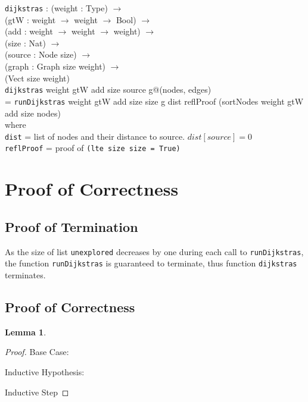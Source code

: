 \documentclass[11pt, oneside]{article}   	%
\newcommand\tab[1][1cm]{\hspace*{#1}}
\newtheorem*{lemma}{Lemma}
\begin{document}
\texttt{dijkstras} :  (weight : Type) $\rightarrow$ \\
                \tab\tab (gtW : weight $\rightarrow$ weight $\rightarrow$ Bool) $\rightarrow$ \\
            	\tab\tab(add : weight $\rightarrow$ weight $\rightarrow$ weight) $\rightarrow$ \\
            	\tab\tab(size : Nat) $\rightarrow$ \\
            	\tab\tab(source : Node size) $\rightarrow$ \\
            	\tab\tab(graph : Graph size weight) $\rightarrow$ \\
            	\tab\tab(Vect size weight)\\
\texttt{dijkstras} weight gtW add size source g@(nodes, edges) \\
\tab  = \texttt{runDijkstras} weight gtW add size size g dist reflProof (sortNodes weight gtW add size nodes) \\
\tab\tab where \\
\tab\tab\tab \texttt{dist} = list of nodes and their distance to source. $dist[source] = 0$\\
\tab\tab\tab \texttt{reflProof} = proof of \texttt{(lte size size = True)}

\section{Proof of Correctness} 

\subsection{Proof of Termination}
As the size of list \texttt{unexplored} decreases by one during each call to \texttt{runDijkstras}, the function \texttt{runDijkstras} is guaranteed to terminate, thus function \texttt{dijkstras} terminates. 

\subsection{Proof of Correctness}
\begin{lemma}

\end{lemma}

\begin{proof}
Base Case:

Inductive Hypothesis:

Inductive Step
\end{proof}
\end{document}
